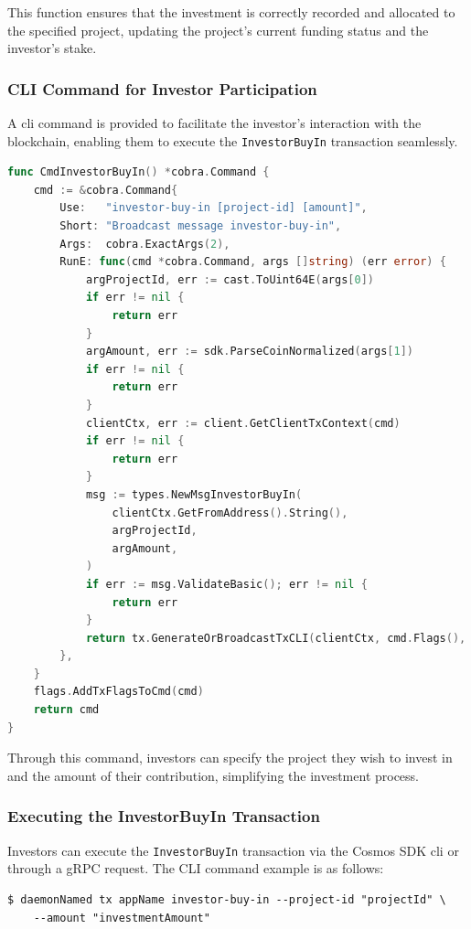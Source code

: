 This function ensures that the investment is correctly recorded and allocated to the specified project, updating the project's current funding status and the investor's stake.

\subsubsection{CLI Command for Investor Participation}
\label{subsubsec:cli-investor-participation}

A \gls{cli} command is provided to facilitate the investor's interaction with the blockchain, enabling them to execute the \texttt{InvestorBuyIn} transaction seamlessly.

\begin{lstlisting}[language=go, caption=Investor Buy-in CLI Definition, label={lst:investor-buyin-cli}]
func CmdInvestorBuyIn() *cobra.Command {
	cmd := &cobra.Command{
		Use:   "investor-buy-in [project-id] [amount]",
		Short: "Broadcast message investor-buy-in",
		Args:  cobra.ExactArgs(2),
		RunE: func(cmd *cobra.Command, args []string) (err error) {
			argProjectId, err := cast.ToUint64E(args[0])
			if err != nil {
				return err
			}
			argAmount, err := sdk.ParseCoinNormalized(args[1])
			if err != nil {
				return err
			}
			clientCtx, err := client.GetClientTxContext(cmd)
			if err != nil {
				return err
			}
			msg := types.NewMsgInvestorBuyIn(
				clientCtx.GetFromAddress().String(),
				argProjectId,
				argAmount,
			)
			if err := msg.ValidateBasic(); err != nil {
				return err
			}
			return tx.GenerateOrBroadcastTxCLI(clientCtx, cmd.Flags(), msg)
		},
	}
	flags.AddTxFlagsToCmd(cmd)
	return cmd
}
\end{lstlisting}

Through this command, investors can specify the project they wish to invest in and the amount of their contribution, simplifying the investment process.

\subsubsection{Executing the InvestorBuyIn Transaction}
\label{subsubsec:executing-investor-buyin}

Investors can execute the \texttt{InvestorBuyIn} transaction via the Cosmos SDK \gls{cli} or through a gRPC request. The CLI command example is as follows:

\begin{verbatim}
$ daemonNamed tx appName investor-buy-in --project-id "projectId" \
    --amount "investmentAmount"
\end{verbatim}

